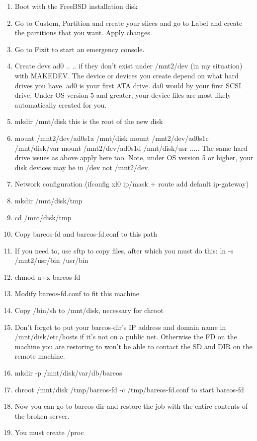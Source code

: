 \begin{enumerate}
\item Boot with the FreeBSD installation disk
\item Go to Custom, Partition and create your slices and go to Label and
   create the partitions that you want. Apply changes.
\item Go to Fixit to start an emergency console.
\item Create devs ad0 .. .. if they don't exist under /mnt2/dev (in my  situation)
   with MAKEDEV. The device or devices you  create depend on what hard drives you
   have. ad0 is your  first ATA drive. da0 would by your first SCSI drive.  Under
OS version 5 and greater, your device files are  most likely automatically
created for you.
\item mkdir /mnt/disk
   this is the root of the new disk
\item mount /mnt2/dev/ad0s1a /mnt/disk
   mount /mnt2/dev/ad0s1c /mnt/disk/var
   mount /mnt2/dev/ad0s1d /mnt/disk/usr
.....
The same hard drive issues as above apply here too.  Note, under OS version 5
or higher, your disk devices may  be in /dev not /mnt2/dev.
\item Network configuration (ifconfig xl0 ip/mask + route add default
   ip-gateway)
\item mkdir /mnt/disk/tmp
\item cd /mnt/disk/tmp
\item Copy bareos-fd and bareos-fd.conf to this path
\item If you need to, use sftp to copy files, after which you must do this:
   ln -s /mnt2/usr/bin /usr/bin
\item chmod u+x bareos-fd
\item Modify bareos-fd.conf to fit this machine
\item Copy /bin/sh to /mnt/disk, necessary for chroot
\item Don't forget to put your bareos-dir's IP address and domain  name in
   /mnt/disk/etc/hosts if it's not on a public net.  Otherwise the FD on the
   machine you are restoring to  won't be able to contact the SD and DIR on the
remote machine.
\item mkdir -p /mnt/disk/var/db/bareos
\item chroot /mnt/disk /tmp/bareos-fd -c /tmp/bareos-fd.conf
   to start bareos-fd
\item Now you can go to bareos-dir and restore the job with the entire
   contents of the broken server.
\item You must create /proc
\end{enumerate}


